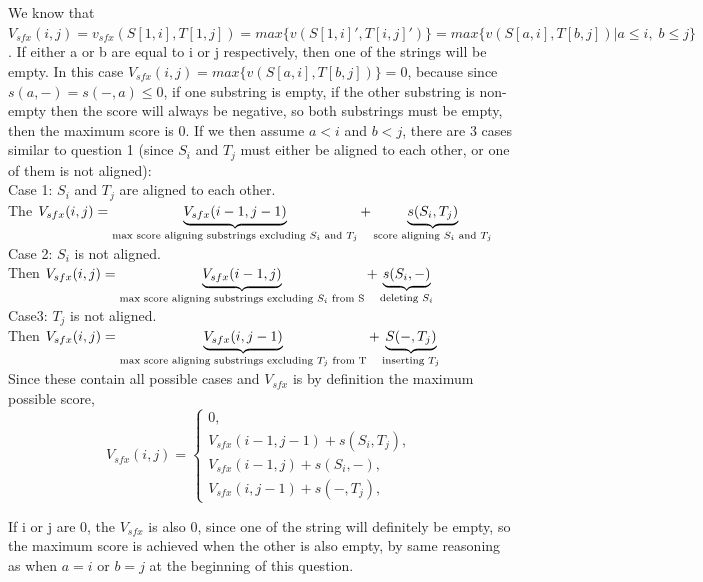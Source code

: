 \documentclass{article}
\begin{document}
	\section{}
	We know that $ V_{sfx}(i, j) = v_{sfx}(S[1, i], T[1, j]) = max \{v(S[1, i]', T[i, j]')\} = max\{v(S[a, i], T[b, j])| a \leq i, \; b \leq j\} $.
	If either a or b are equal to i or j respectively, then one of the strings will be empty. In this case $ V_{sfx}(i, j) = max\{v(S[a, i], T[b, j])\} = 0 $, because since $ s(a, -) = s(-, a) \leq 0 $, if one substring is empty, if the other substring is non-empty then the score will always be negative, so both substrings must be empty, then the maximum score is 0.
	If we then assume $ a < i $ and $ b < j $, there are 3 cases similar to question 1 (since $ S_i $ and $ T_j $ must either be aligned to each other, or one of them is not aligned):\\
	Case 1: $ S_i $ and $ T_j $ are aligned to each other.\\
	The $ V_{sfx}(i, j) = \underbrace{V_{sfx}(i-1, j-1)}_\text{max score aligning substrings excluding $ S_i $ and $ T_j $} + \underbrace{s(S_i, T_j)}_\text{score aligning $ S_i $ and $ T_j $}$\\
	Case 2: $ S_i $ is not aligned.\\
	Then $ V_{sfx}(i, j) = \underbrace{V_{sfx}(i-1, j)}_\text{max score aligning substrings excluding $ S_i $ from S} + \underbrace{s(S_i, -)}_\text{deleting $ S_i $} $\\
	Case3: $ T_j $ is not aligned.\\
	Then $ V_{sfx}(i, j) = \underbrace{V_{sfx}(i, j-1)}_\text{max score aligning substrings excluding $ T_j $ from T} + \underbrace{S(-, T_j)}_\text{inserting $ T_j $} $\\
	
	Since these contain all possible cases and $ V_{sfx} $ is by definition the maximum possible score, 
	\[V_{sfx}(i, j) = \begin{cases}
		0, \\
		V_{sfx}(i-1, j-1) + s(S_i, T_j),\\
		V_{sfx}(i-1, j) + s(S_i, -),\\
		V_{sfx}(i, j-1) + s(-, T_j),
	\end{cases}\]

	If i or j are 0, the $ V_{sfx} $ is also 0, since one of the string will definitely be empty, so the maximum score is achieved when the other is also empty, by same reasoning as when $ a = i $ or $ b = j $ at the beginning of this question.
	
\end{document}
